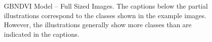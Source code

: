 \begin{figure}[h!]
    \caption[GBNDVI Model – Full Sized Images]{GBNDVI Model – Full Sized Images. The captions below the partial illustrations correspond to the classes shown in the example images. However, the illustrations generally show more classes than are indicated in the captions.}
    \label{fig:gbndvi_perm_exp_examples_fs}
\end{figure}

